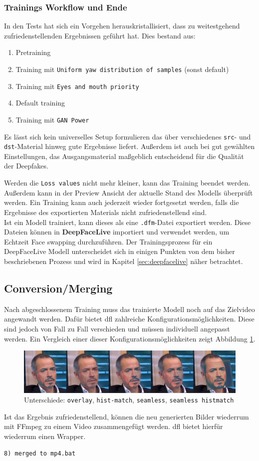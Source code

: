\subsubsection*{Trainings Workflow und Ende}
In den Tests hat sich ein Vorgehen herauskristallisiert, dass zu weitestgehend zufriedenstellenden Ergebnissen geführt hat.
Dies bestand aus:
\begin{enumerate}
    \item Pretraining
    \item Training mit \texttt{Uniform yaw distribution of samples} (sonst default)
    \item Training mit \texttt{Eyes and mouth priority}
    \item Default training
    \item Training mit \texttt{GAN Power}
\end{enumerate}
Es lässt sich kein universelles Setup formulieren das über verschiedenes \texttt{src}- und \texttt{dst}-Material hinweg gute Ergebnisse liefert.
Außerdem ist auch bei gut gewählten Einstellungen, das Ausgangsmaterial maßgeblich entscheidend für die Qualität der Deepfakes.

Werden die \texttt{Loss values} nicht mehr kleiner, kann das Training beendet werden.
Außerdem kann in der Preview Ansicht der aktuelle Stand des Modells überprüft werden.
Ein Training kann auch jederzeit wieder fortgesetzt werden, falls die Ergebnisse des exportierten Materials nicht zufriedenstellend sind.\\

Ist ein Modell trainiert, kann dieses als eine \texttt{.dfm}-Datei exportiert werden.
Diese Dateien können in \textbf{DeepFaceLive} importiert und verwendet werden, um Echtzeit Face swapping durchzuführen.
Der Trainingsprozess für ein DeepFaceLive Modell unterscheidet sich in einigen Punkten von dem bisher beschriebenen Prozess und wird in Kapitel \ref{sec:deepfacelive} näher betrachtet.

\subsection*{Conversion/Merging}
Nach abgeschlossenem Training muss das trainierte Modell noch auf das Zielvideo angewandt werden.
Dafür bietet \gls{dfl} zahlreiche Konfigurationsmöglichkeiten.
Diese sind jedoch von Fall zu Fall verschieden und müssen individuell angepasst werden.
Ein Vergleich einer dieser Konfigurationsmöglichkeiten zeigt Abbildung \ref{fig:merger-comparison}.
\begin{figure}
    \center
    \includegraphics[width=\textwidth]{Bilder/DFL/merger-comparison}
    \caption{Unterschiede: \texttt{overlay}, \texttt{hist-match}, \texttt{seamless}, \texttt{seamless histmatch}}
    \label{fig:merger-comparison}
\end{figure}

Ist das Ergebnis zufriedenstellend, können die neu generierten Bilder wiederrum mit FFmpeg zu einem Video zusammengefügt werden.
\gls{dfl} bietet hierfür wiederrum einen Wrapper.
\begin{lstlisting}[numbers=none,label={lst:merged-to-mp4}]
    8) merged to mp4.bat
\end{lstlisting}